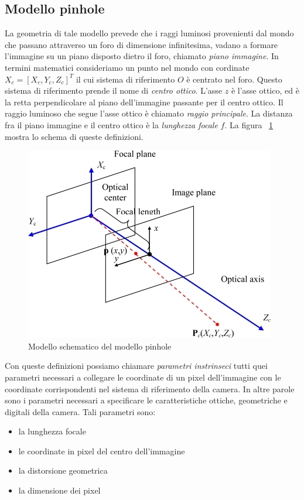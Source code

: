 \subsection{Modello pinhole}
La geometria di tale modello prevede che i raggi luminosi provenienti dal mondo che passano attraverso un foro di dimensione infinitesima, vadano a formare l'immagine su un piano disposto dietro il foro, chiamato \emph{piano immagine}. In termini matematici consideriamo un punto nel mondo con cordinate $X_c = [X_c, Y_c, Z_c]^T $ il cui sistema di riferimento $O$ è centrato nel foro. Questo sistema di riferimento prende il nome di \emph{centro ottico}. L'asse $z$ è l'asse ottico, ed è la retta perpendicolare al piano dell'immagine passante per il centro ottico. Il raggio luminoso che segue l'asse ottico è chiamato \emph{raggio principale}. La distanza fra il piano immagine e il centro ottico è la \emph{lunghezza focale} $f$. La figura ~\ref{fig:pinhole} mostra lo schema di queste definizioni.
\begin{figure}[H]
   \centering
   \includegraphics[width=.7\columnwidth]{pinhole.png}
   \caption{Modello schematico del modello pinhole}
   \label{fig:pinhole} 
\end{figure}
Con queste definizioni possiamo chiamare \emph{parametri instrinseci} tutti quei parametri necessari a collegare le coordinate di un pixel dell'immagine con le coordinate corrispondenti nel sistema di riferimento della camera. In altre parole sono i parametri necessari a specificare le caratteristiche ottiche, geometriche e digitali della camera. Tali parametri sono:
\begin{itemize}
\item la lunghezza focale
\item le coordinate in pixel del centro dell'immagine
\item la distorsione geometrica 
\item la dimensione dei pixel
\end{itemize}
